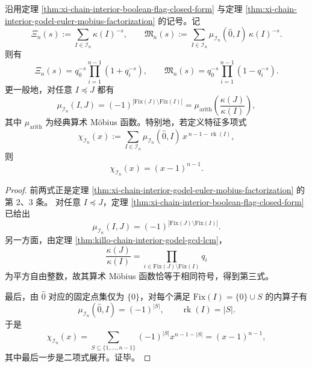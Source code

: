 \begin{corollary}\label{cor:xi-chain-interior-dirichlet-mobius-characteristic-closure}
沿用定理 \ref{thm:xi-chain-interior-boolean-flag-closed-form} 与定理 \ref{thm:xi-chain-interior-godel-euler-mobius-factorization} 的记号。记
\[
\Xi_n(s):=\sum_{I\in\mathcal I_n}\kappa(I)^{-s},
\qquad
\mathfrak M_n(s):=\sum_{I\in\mathcal I_n}\mu_{\mathcal I_n}(\widehat 0,I)\,\kappa(I)^{-s}.
\]
则有
\[
\Xi_n(s)=q_0^{-s}\prod_{i=1}^{n-1}(1+q_i^{-s}),
\qquad
\mathfrak M_n(s)=q_0^{-s}\prod_{i=1}^{n-1}(1-q_i^{-s}).
\]
更一般地，对任意 \(I\preceq J\) 都有
\[
\mu_{\mathcal I_n}(I,J)
=
(-1)^{|\mathrm{Fix}(J)\setminus \mathrm{Fix}(I)|}
=
\mu_{\mathrm{arith}}\!\left(\frac{\kappa(J)}{\kappa(I)}\right),
\]
其中 \(\mu_{\mathrm{arith}}\) 为经典算术 Möbius 函数。特别地，若定义特征多项式
\[
\chi_{\mathcal I_n}(x)
:=
\sum_{I\in\mathcal I_n}\mu_{\mathcal I_n}(\widehat 0,I)\,
x^{\,n-1-\operatorname{rk}(I)},
\]
则
\[
\chi_{\mathcal I_n}(x)=(x-1)^{n-1}.
\]
\end{corollary}
\begin{proof}
前两式正是定理 \ref{thm:xi-chain-interior-godel-euler-mobius-factorization} 的第 \(2\)、\(3\) 条。
对任意 \(I\preceq J\)，定理 \ref{thm:xi-chain-interior-boolean-flag-closed-form} 已给出
\[
\mu_{\mathcal I_n}(I,J)=(-1)^{|\mathrm{Fix}(J)\setminus \mathrm{Fix}(I)|}.
\]
另一方面，由定理 \ref{thm:killo-chain-interior-godel-gcd-lcm}，
\[
\frac{\kappa(J)}{\kappa(I)}
=
\prod_{i\in \mathrm{Fix}(J)\setminus \mathrm{Fix}(I)}q_i
\]
为平方自由整数，故其算术 Möbius 函数恰等于相同符号，得到第三式。

最后，由 \(\widehat 0\) 对应的固定点集仅为 \(\{0\}\)，对每个满足 \(\mathrm{Fix}(I)=\{0\}\cup S\) 的内算子有
\[
\mu_{\mathcal I_n}(\widehat 0,I)=(-1)^{|S|},
\qquad
\operatorname{rk}(I)=|S|.
\]
于是
\[
\chi_{\mathcal I_n}(x)
=
\sum_{S\subseteq\{1,\dots,n-1\}}(-1)^{|S|}x^{n-1-|S|}
=
(x-1)^{n-1},
\]
其中最后一步是二项式展开。证毕。
\end{proof}

